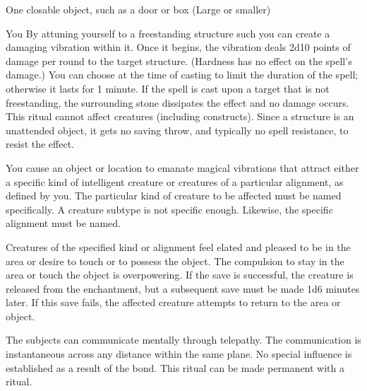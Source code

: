 \begin{spelltarget}{One closable object, such as a door or box (Large or smaller)}
\begin{spelltarget}{You}
\spelleffect By attuning yourself to a freestanding structure such you can create a damaging vibration within it. Once it begins, the vibration deals 2d10 points of damage per round to the target structure. (Hardness has no effect on the spell's damage.) You can choose at the time of casting to limit the duration of the spell; otherwise it lasts for 1 minute. If the spell is cast upon a target that is not freestanding, the surrounding stone dissipates the effect and no damage occurs.
\spellnotes This ritual cannot affect creatures (including constructs). Since a structure is an unattended object, it gets no saving throw, and typically no spell resistance, to resist the effect.

\spelleffect You cause an object or location to emanate magical vibrations that attract either a specific kind of intelligent creature or creatures of a particular alignment, as defined by you. The particular kind of creature to be affected must be named specifically. A creature subtype is not specific enough. Likewise, the specific alignment must be named.
\par Creatures of the specified kind or alignment feel elated and pleased to be in the area or desire to touch or to possess the object. The compulsion to stay in the area or touch the object is overpowering. If the save is successful, the creature is released from the enchantment, but a subsequent save must be made 1d6 minutes later. If this save fails, the affected creature attempts to return to the area or object.

\spelldur{\durext \dismissable}
\spelleffect The subjects can communicate mentally through telepathy. The communication is instantaneous across any distance within the same plane.
\spellnotes No special influence is established as a result of the bond. This ritual can be made permanent with a  ritual.


\end{spelltarget}
\end{spelltarget}
